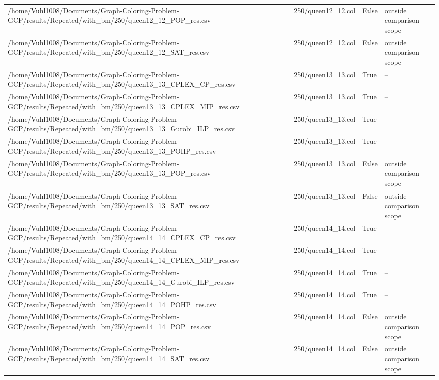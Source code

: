 \begin{table}[htbp]
\begin{tabular}{llll}
/home/Vuhl1008/Documents/Graph-Coloring-Problem-GCP/results/Repeated/with\_bm/250/queen12\_12\_POP\_res.csv & 250/queen12\_12.col & False & outside comparison scope \\
/home/Vuhl1008/Documents/Graph-Coloring-Problem-GCP/results/Repeated/with\_bm/250/queen12\_12\_SAT\_res.csv & 250/queen12\_12.col & False & outside comparison scope \\
/home/Vuhl1008/Documents/Graph-Coloring-Problem-GCP/results/Repeated/with\_bm/250/queen13\_13\_CPLEX\_CP\_res.csv & 250/queen13\_13.col & True & -- \\
/home/Vuhl1008/Documents/Graph-Coloring-Problem-GCP/results/Repeated/with\_bm/250/queen13\_13\_CPLEX\_MIP\_res.csv & 250/queen13\_13.col & True & -- \\
/home/Vuhl1008/Documents/Graph-Coloring-Problem-GCP/results/Repeated/with\_bm/250/queen13\_13\_Gurobi\_ILP\_res.csv & 250/queen13\_13.col & True & -- \\
/home/Vuhl1008/Documents/Graph-Coloring-Problem-GCP/results/Repeated/with\_bm/250/queen13\_13\_POHP\_res.csv & 250/queen13\_13.col & True & -- \\
/home/Vuhl1008/Documents/Graph-Coloring-Problem-GCP/results/Repeated/with\_bm/250/queen13\_13\_POP\_res.csv & 250/queen13\_13.col & False & outside comparison scope \\
/home/Vuhl1008/Documents/Graph-Coloring-Problem-GCP/results/Repeated/with\_bm/250/queen13\_13\_SAT\_res.csv & 250/queen13\_13.col & False & outside comparison scope \\
/home/Vuhl1008/Documents/Graph-Coloring-Problem-GCP/results/Repeated/with\_bm/250/queen14\_14\_CPLEX\_CP\_res.csv & 250/queen14\_14.col & True & -- \\
/home/Vuhl1008/Documents/Graph-Coloring-Problem-GCP/results/Repeated/with\_bm/250/queen14\_14\_CPLEX\_MIP\_res.csv & 250/queen14\_14.col & True & -- \\
/home/Vuhl1008/Documents/Graph-Coloring-Problem-GCP/results/Repeated/with\_bm/250/queen14\_14\_Gurobi\_ILP\_res.csv & 250/queen14\_14.col & True & -- \\
/home/Vuhl1008/Documents/Graph-Coloring-Problem-GCP/results/Repeated/with\_bm/250/queen14\_14\_POHP\_res.csv & 250/queen14\_14.col & True & -- \\
/home/Vuhl1008/Documents/Graph-Coloring-Problem-GCP/results/Repeated/with\_bm/250/queen14\_14\_POP\_res.csv & 250/queen14\_14.col & False & outside comparison scope \\
/home/Vuhl1008/Documents/Graph-Coloring-Problem-GCP/results/Repeated/with\_bm/250/queen14\_14\_SAT\_res.csv & 250/queen14\_14.col & False & outside comparison scope \\

\end{tabular}
\end{table}
